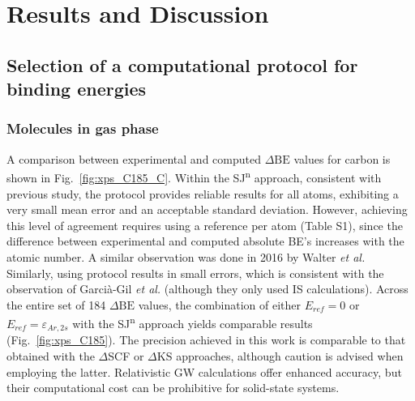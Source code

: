 \documentclass[journal=jpccck,manuscript=article]{achemso}
\def\dbe{\ensuremath{\Delta\text{BE}}}
\begin{document}
\clearpage



\section{Results and Discussion}\label{sec:results}


\subsection{Selection of a computational protocol for binding energies}\label{sec:proto}

\subsubsection{Molecules in gas phase}

A comparison between experimental and computed \dbe{} values for carbon is shown in Fig.~\ref{fig:xps_C185_C}. Within the SJ\textsuperscript{n} approach, consistent with previous study\cite{pueyobellafontPredictingCoreLevel2017}, the  protocol provides reliable results for all atoms, exhibiting a very small mean error and an acceptable standard deviation. However, achieving this level of agreement requires using a reference per atom (Table S1), since the difference between experimental and computed absolute BE's increases with the atomic number. A similar observation was done in 2016 by Walter \textit{et al.}\cite{walterOffsetcorrectedKohnShamScheme2016} Similarly, using  protocol results in small errors, which is consistent with the observation of Garcià-Gil \textit{et al.}\cite{garcia-gilCalculationCoreLevel2012} (although they only used IS calculations). Across the entire set of 184 \dbe{} values, the combination of either $E_{ref}=0$ or $E_{ref}=\varepsilon_{Ar,2s}$ with the SJ\textsuperscript{n} approach yields comparable results (Fig.~\ref{fig:xps_C185}). 
The precision achieved in this work is comparable to that obtained with the  $\Delta$SCF\cite{golzeAccurateAbsoluteRelative2020,kleinNutsBoltsCorehole2021} or $\Delta$KS\cite{vandenbosscheEffectsNonlocalExchange2014,garcia-gilCalculationCoreLevel2012,walterOffsetcorrectedKohnShamScheme2016} approaches, although caution is advised when employing the latter\cite{pueyobellafontPredictionCoreLevel2015}. Relativistic GW calculations offer enhanced accuracy\cite{golzeAccurateAbsoluteRelative2020}, but their computational cost can be prohibitive for solid-state systems\cite{leiGaussianbasedQuasiparticleSelfconsistent2022}.
\end{document}
